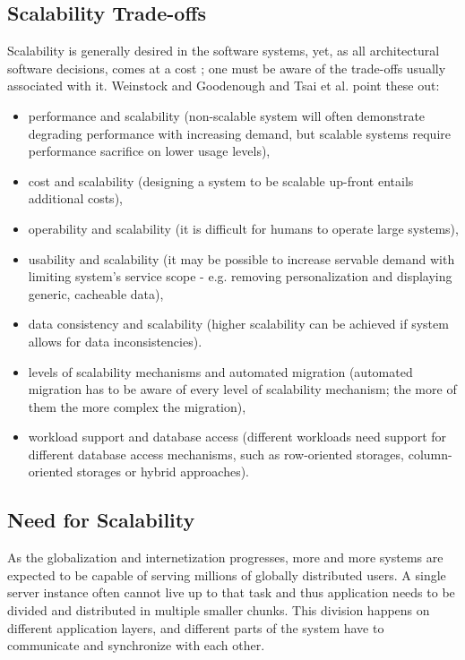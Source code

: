 \documentclass{uvamscse}
\begin{document}
\subsection{Scalability Trade-offs}
Scalability is generally desired in the software systems, yet, as all architectural software decisions, comes at a cost \cite{GerHeiBench}; one must be aware of the trade-offs usually associated with it. Weinstock and Goodenough \cite{WeinstockOnSystem2006} and Tsai et al. \cite{WeiTek} point these out:
\begin{itemize}
  \item performance and scalability (non-scalable system will often demonstrate degrading performance with increasing demand, but scalable systems require performance sacrifice on lower usage levels),
  \item cost and scalability (designing a system to be scalable up-front entails additional costs),
  \item operability and scalability (it is difficult for humans to operate large systems),
  \item usability and scalability (it may be possible to increase servable demand with limiting system's service scope - e.g. removing personalization and displaying generic, cacheable data),
  \item data consistency and scalability (higher scalability can be achieved if system allows for data inconsistencies).
  \item levels of scalability mechanisms and automated migration (automated migration has to be aware of every level of scalability mechanism; the more of them the more complex the migration),
  \item workload support and database access (different workloads need support for different database access mechanisms, such as row-oriented storages, column-oriented storages or hybrid approaches).
\end{itemize}

\subsection{Need for Scalability}

As the globalization and internetization progresses, more and more systems are expected to be capable of serving millions of globally distributed users. A single server instance often cannot live up to that task and thus application needs to be divided and distributed in multiple smaller chunks. This division happens on different application layers, and different parts of the system have to communicate and synchronize with each other.
\end{document}
